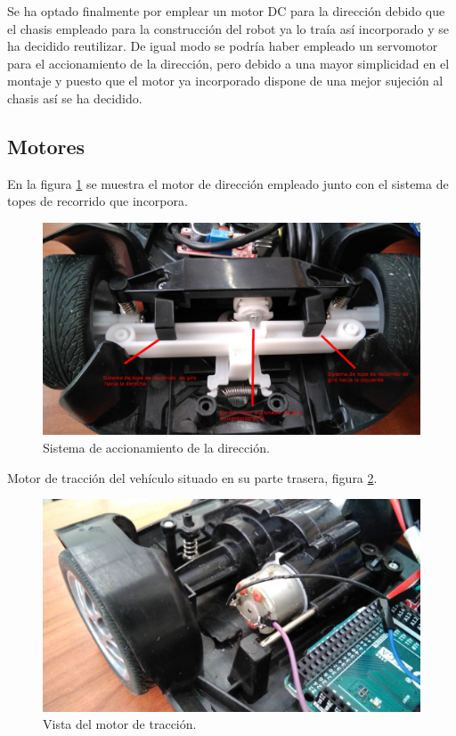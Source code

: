 Se ha optado finalmente por emplear un motor DC para la dirección debido que el chasis empleado para la construcción del robot ya lo traía así incorporado y se ha decidido reutilizar.
De igual modo se podría haber empleado un servomotor para el accionamiento de la dirección, pero debido a una mayor simplicidad en el montaje y puesto que el motor ya incorporado
dispone de una mejor sujeción al chasis así se ha decidido.\\

\subsection{Motores}

En la figura \ref{img:sistema_direccion} se muestra el motor de dirección empleado junto con el sistema de topes de recorrido que incorpora.\\


\begin{figure}[H]
  \begin{center}
    \includegraphics[scale=0.2]{imagenes/robot/motor-direccion.jpg}
  \end{center}
  \caption{Sistema de accionamiento de la dirección.}
  \label{img:sistema_direccion}
\end{figure}

Motor de tracción del vehículo situado en su parte trasera, figura \ref{img:motor_traccion}.

\begin{figure}[H]
  \begin{center}
    \includegraphics[scale=0.2]{imagenes/robot/motor-traccion.jpeg}
  \end{center}
  \caption{Vista del motor de tracción.}
  \label{img:motor_traccion}
\end{figure}



